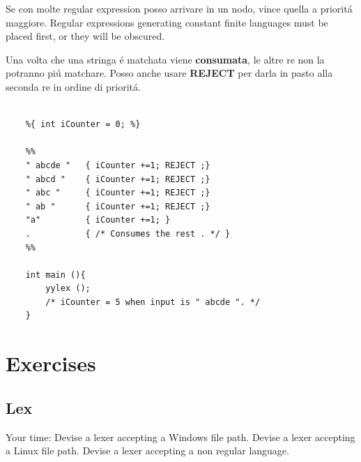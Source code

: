 \begin{tcolorbox}\begin{center}
	Se con molte regular expression posso arrivare in un nodo, vince quella a priorit\'a maggiore.
	Regular expressions generating constant finite languages must be placed first, or they will be obscured.
\end{center}\end{tcolorbox}

Una volta che una stringa \'e matchata viene \textbf{consumata}, le altre re non la potranno pi\'u matchare. 
Posso anche usare \textbf{REJECT} per darla in pasto alla seconda re in ordine di priorit\'a.

\begin{lstlisting}

	%{ int iCounter = 0; %}

	%%
	" abcde "	{ iCounter +=1; REJECT ;}
	" abcd "	{ iCounter +=1; REJECT ;}
	" abc "		{ iCounter +=1; REJECT ;}
	" ab "		{ iCounter +=1; REJECT ;}
	"a"			{ iCounter +=1; }
	.			{ /* Consumes the rest . */ }
	%%

	int main (){
		yylex ();
		/* iCounter = 5 when input is " abcde ". */
	}
\end{lstlisting}

\chapter{Exercises}
\section{Lex}
	Your time:
	Devise a lexer accepting a Windows file path.
	Devise a lexer accepting a Linux file path.
	Devise a lexer accepting a non regular language.